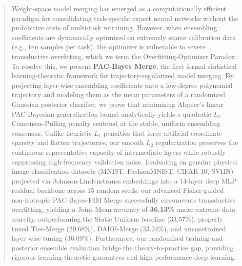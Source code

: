 \begin{abstract}
Weight-space model merging has emerged as a computationally efficient paradigm for consolidating task-specific expert neural networks without the prohibitive costs of multi-task retraining. 
However, when ensembling coefficients are dynamically optimized on extremely scarce calibration data (e.g., ten samples per task), the optimizer is vulnerable to severe transductive overfitting, which we term the Overfitting-Optimizer Paradox. 
To resolve this, we present \textbf{PAC-Bayes Merge}, the first formal statistical learning-theoretic framework for trajectory-regularized model merging. 
By projecting layer-wise ensembling coefficients onto a low-degree polynomial trajectory and modeling them as the mean parameters of a randomized Gaussian posterior classifier, we prove that minimizing Alquier's linear PAC-Bayesian generalization bound analytically yields a quadratic $L_2$ Consensus-Pulling penalty centered at the stable, uniform ensembling consensus. 
Unlike heuristic $L_1$ penalties that force artificial coordinate sparsity and flatten trajectories, our smooth $L_2$ regularization preserves the continuous representative capacity of intermediate layers while robustly suppressing high-frequency validation noise. 
Evaluating on genuine physical image classification datasets (MNIST, FashionMNIST, CIFAR-10, SVHN) projected via Johnson-Lindenstrauss embeddings into a 14-layer deep MLP residual backbone across 15 random seeds, our advanced Fisher-guided non-isotropic PAC-Bayes-FIM Merge successfully circumvents transductive overfitting, yielding a Joint Mean accuracy of \textbf{36.13\%} under extreme data scarcity, outperforming the Static Uniform baseline (33.57\%), properly tuned Ties-Merge (29.68\%), DARE-Merge (33.24\%), and unconstrained layer-wise tuning (36.09\%). 
Furthermore, our randomized training and posterior ensemble evaluation bridge the theory-to-practice gap, providing rigorous learning-theoretic guarantees and high-performance deep learning.
\end{abstract}
